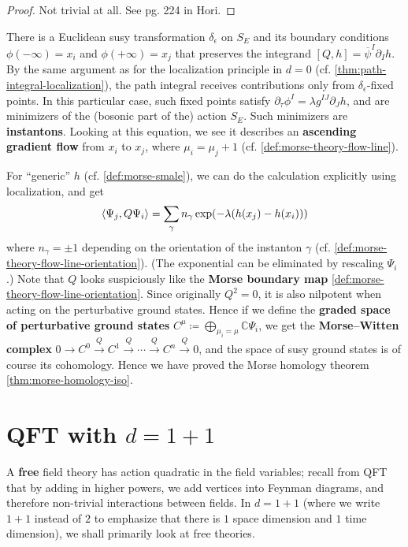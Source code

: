 \documentclass{report}
\theoremstyle{plain}
\theoremstyle{definition}
\theoremstyle{remark}
\newcommand{\di}{\partial}
\newcommand{\bC}{\mathbb{C}}
\newcommand{\cnj}{\overline}
\begin{document}
\begin{proof}
  Not trivial at all. See pg. 224 in Hori.
\end{proof}

There is a Euclidean susy transformation $\delta_\epsilon$ on $S_E$
and its boundary conditions $\phi(-\infty) = x_i$ and $\phi(+\infty) =
x_j$ that preserves the integrand $[Q, h] = \cnj\psi^I\di_Ih$. By the
same argument as for the localization principle in $d=0$ (cf.
\ref{thm:path-integral-localization}), the path integral receives
contributions only from $\delta_\epsilon$-fixed points. In this
particular case, such fixed points satisfy $\di_\tau \phi^I = \lambda
g^{IJ} \di_J h$, and are minimizers of the (bosonic part of the)
action $S_E$. Such minimizers are {\bf instantons}. Looking at this
equation, we see it describes an {\bf ascending gradient flow} from
$x_i$ to $x_j$, where $\mu_i = \mu_j+1$ (cf.
\ref{def:morse-theory-flow-line}).

For ``generic'' $h$ (cf. \ref{def:morse-smale}), we can do the
calculation explicitly using localization, and get
\[ \braket{\Psi_j, Q\Psi_i} = \sum_\gamma n_\gamma \exp(-\lambda(h(x_j) - h(x_i))) \]
where $n_\gamma = \pm 1$ depending on the orientation of the instanton
$\gamma$ (cf. \ref{def:morse-theory-flow-line-orientation}). (The
exponential can be eliminated by rescaling $\Psi_i$.) Note that $Q$
looks suspiciously like the {\bf Morse boundary map}
\ref{def:morse-theory-flow-line-orientation}. Since originally $Q^2 =
0$, it is also nilpotent when acting on the perturbative ground
states. Hence if we define the {\bf graded space of perturbative
  ground states} $C^\mu \coloneqq \bigoplus_{\mu_i=\mu} \bC\Psi_i$, we
get the {\bf Morse--Witten complex} $0 \to C^0 \xrightarrow{Q} C^1
\xrightarrow{Q} \cdots \xrightarrow{Q} C^n \xrightarrow{Q} 0$, and the
space of susy ground states is of course its cohomology. Hence we have
proved the Morse homology theorem \ref{thm:morse-homology-iso}.

\section{QFT with \texorpdfstring{$d=1+1$}{d=1+1}} \label{sec:1d-qft}

A {\bf free} field theory has action quadratic in the field variables;
recall from QFT that by adding in higher powers, we add vertices into
Feynman diagrams, and therefore non-trivial interactions between
fields. In $d=1+1$ (where we write $1+1$ instead of $2$ to emphasize
that there is $1$ space dimension and $1$ time dimension), we shall
primarily look at free theories.
\end{document}
